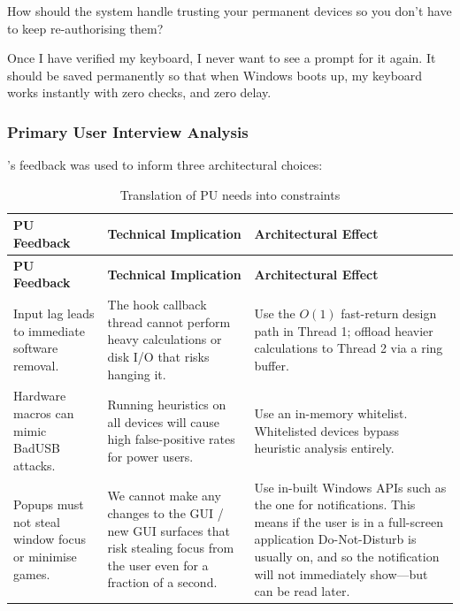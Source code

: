\begin{description}[style=multiline, leftmargin=3.2cm, font=\normalfont\ttfamily\bfseries]
	\item[\stakeholdersME:] How should the system handle trusting your permanent devices so you don't have to keep re-authorising them?
	\item[\stakeholdersPU:] Once I have verified my keyboard, I never want to see a prompt for it again. It should be saved permanently so that when Windows boots up, my keyboard works instantly with zero checks, and zero delay.
\end{description}

\subsubsection{Primary User Interview Analysis}

\stakeholdersPU's feedback was used to inform three architectural choices:

{\small
\renewcommand{\arraystretch}{1.25}
\begin{xltabular}{\textwidth}{@{} P{3.3cm} L L @{}}
	\caption{Translation of PU needs into constraints} \label{tab:user_requirements_mapping} \\
	\toprule
	\textbf{PU Feedback} & \textbf{Technical Implication} & \textbf{Architectural Effect} \\
	\midrule
	\endfirsthead

	\toprule
	\textbf{PU Feedback} & \textbf{Technical Implication} & \textbf{Architectural Effect} \\
	\midrule
	\endhead


	Input lag leads to immediate software removal. &
	The hook callback thread cannot perform heavy calculations or disk I/O that risks hanging it. &
	Use the $O(1)$ fast-return design path in Thread 1; offload heavier calculations to Thread 2 via a ring buffer. \\

	Hardware macros can mimic BadUSB attacks. &
	Running heuristics on all devices will cause high false-positive rates for power users. &
	Use an in-memory whitelist. Whitelisted devices bypass heuristic analysis entirely. \\

	Popups must not steal window focus or minimise games. &
	We cannot make any changes to the GUI / new GUI surfaces that risk stealing focus from the user even for a fraction of a second. &
	Use in-built Windows APIs such as the one for notifications. This means if the user is in a full-screen application Do-Not-Disturb is usually on, and so the notification will not immediately show---but can be read later. \\
\end{xltabular}
}

